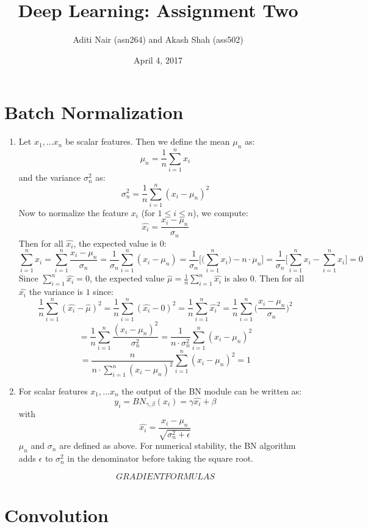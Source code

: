 \documentclass[a4paper]{article}
\title{Deep Learning: Assignment Two}
\author{Aditi Nair (asn264) and Akash Shah (ass502)}
\date{April 4, 2017}
\begin{document}
\maketitle

\section{Batch Normalization}

\begin{enumerate}
\item{Let $x_1,...x_n$ be scalar features. Then we define the mean $\mu_n$ as:
$$ \mu_n = \frac{1}{n} \sum_{i=1}^n x_i$$
and the variance $\sigma_n^2$ as:
$$ \sigma_n^2 = \frac{1}{n} \sum_{i=1}^n (x_i - \mu_n)^2$$
Now to normalize the feature $x_i$ (for $ 1 \leq i \leq n$), we compute: 
$$\hat{x_i} = \frac{x_i - \mu_n}{\sigma_n}$$
Then for all $\hat{x_i}$, the expected value is $0$:
$$\sum_{i=1}^n \hat{x_i} = \sum_{i=1}^n \frac{x_i - \mu_n}{\sigma_n} 
= \frac{1}{\sigma_n} \sum_{i=1}^n (x_i - \mu_n) 
=  \frac{1}{\sigma_n}  \Bigg[ \Bigg( \sum_{i=1}^n x_i \Bigg) - n \cdot \mu_n    \Bigg]
=  \frac{1}{\sigma_n}  \Bigg[ \sum_{i=1}^n x_i  - \sum_{i=1}^n x_i  \Bigg] = 0$$
Since $\sum_{i=1}^n \hat{x_i} = 0$, the expected value $\hat{\mu} = \frac{1}{n} \sum_{i=1}^n \hat{x_i}$ is also 0.
\newline
\newline
Then for all $\hat{x_i}$ the variance is $1$ since:
$$\frac{1}{n}\sum_{i=1}^n (\hat{x_i} - \hat{\mu})^2 = \frac{1}{n}\sum_{i=1}^n (\hat{x_i} - 0)^2 = \frac{1}{n}\sum_{i=1}^n \hat{x_i}^2 
=  \frac{1}{n}\sum_{i=1}^n \Big( \frac{x_i - \mu_n}{\sigma_n} \Big)^2 $$
$$ = \frac{1}{n}\sum_{i=1}^n  \frac{(x_i - \mu_n)^2}{\sigma_n^2} = \frac{1}{n \cdot \sigma_n^2} \sum_{i=1}^n  (x_i - \mu_n)^2$$
$$
= \frac{n}{n \cdot \sum_{i=1}^n (x_i - \mu_n)^2}  \sum_{i=1}^n  (x_i - \mu_n)^2 = 1
$$}
\item{ For scalar features $x_1,...x_n$ the output of the BN module can be written as:
$$y_i = BN_{\gamma,\beta}(x_i) = \gamma \hat{x_i} + \beta $$
with
$$\hat{x_i} = \frac{x_i - \mu_n}{\sqrt{\sigma_n^2 + \epsilon}}$$
$\mu_n$ and $\sigma_n$ are defined as above. For numerical stability, the BN algorithm adds $\epsilon$ to $\sigma_n^2$ in the denominator before taking the square root. 

$$ GRADIENT FORMULAS$$
}
\end{enumerate}

\section{Convolution}
\end{document}
